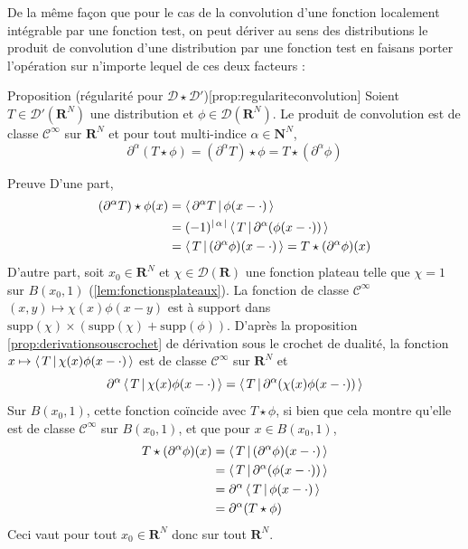         De la même façon que pour le cas de la convolution d’une fonction localement intégrable par une fonction test, on peut dériver au sens des distributions le produit de convolution d’une distribution par une fonction test en faisans porter l’opération sur n’importe lequel de ces deux facteurs :

        \begin{omed}{Proposition (régularité pour $\mathcal{D} \star \mathcal{D}'$)}[prop:regulariteconvolution]
            Soient $T \in \mathcal{D}'(\mathbf{R}^N)$ une distribution et $\phi \in \mathcal{D}(\mathbf{R}^N)$. Le produit de convolution est de classe $\mathcal{C}^{\infty}$ sur $\mathbf{R}^N$ et pour tout multi-indice $\alpha \in \mathbf{N}^N$, 
            \[ \partial^{\alpha}(T \star \phi) = (\partial^{\alpha} T) \star \phi = T \star (\partial^{\alpha} \phi) \]    
        \end{omed}

        \begin{demo}{Preuve}
            D’une part, 
            \begin{align*}
                (\partial^{\alpha} T) \star \phi(x) 
                &= \left< \, \partial^{\alpha} T \, \middle| \, \phi(x - \cdot) \, \right> \\
                &= (-1)^{\left\lvert \, \alpha \, \right\rvert}\left< \, T \, \middle| \, \partial^{\alpha}(\phi(x - \cdot)) \, \right> \\
                &= \left< \, T \, \middle| \, (\partial^{\alpha} \phi) (x - \cdot) \, \right> = T \star (\partial^{\alpha} \phi)(x)
            \end{align*}
            D’autre part, soit $x_0 \in \mathbf{R}^N$ et $\chi \in \mathcal{D}(\mathbf{R})$ une fonction plateau telle que $\chi=1$ sur $B(x_0,1)$ (\ref{lem:fonctionsplateaux}). La fonction de classe $\mathcal{C}^{\infty}$ $(x, y) \mapsto \chi(x) \phi(x-y)$ est à support dans $\text{supp}(\chi) \times (\text{supp}(\chi) + \text{supp}(\phi))$. D’après la proposition \ref{prop:derivationsouscrochet} de dérivation sous le crochet de dualité, la fonction $x \mapsto \left< \, T \, \middle| \, \chi(x)\phi(x - \cdot) \, \right>$ est de classe $\mathcal{C}^{\infty}$ sur $\mathbf{R}^N$ et 
            \[ \partial^{\alpha} \left< \, T \, \middle| \, \chi(x) \phi(x - \cdot) \, \right> = \left< \, T \, \middle| \, \partial^{\alpha} (\chi(x) \phi(x - \cdot)) \, \right> \]   
            Sur $B(x_0,1)$, cette fonction coïncide avec $T \star \phi$, si bien que cela montre qu’elle est de classe $\mathcal{C}^{\infty}$ sur $B(x_0,1)$, et que pour $x \in B(x_0,1)$, 
            \begin{align*}
                T \star (\partial^{\alpha} \phi)(x) 
                &= \left< \, T \, \middle| \, (\partial^{\alpha} \phi)(x - \cdot) \, \right> \\
                &= \left< \, T \, \middle| \, \partial^{\alpha}(\phi(x - \cdot)) \, \right> \\
                &= \partial^{\alpha} \left< \, T \, \middle| \, \phi(x - \cdot) \, \right> \\
                &= \partial^{\alpha} (T \star \phi)
            \end{align*}
            Ceci vaut pour tout $x_0 \in \mathbf{R}^N$ donc sur tout $\mathbf{R}^N$.
        \end{demo}

